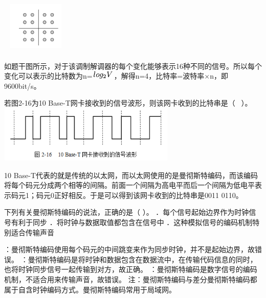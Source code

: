 ~
\includegraphics[width=1.04167in,height=1.04167in]{computerassets/B4EF6AF3A7F2C9C0FE3B7D8F48920A13.png}
\par{}
\begin{solution}如题干图所示，对于该调制解调器的每个变化能够表示16种不同的信号。所以每个变化可以表示的比特数为n=\includegraphics[width=0.43750in,height=0.14583in]{texmath/59cdc05Cdpi7B3507Dlog_2V}，解得n=4，比特率=波特率×n，即9600bit/s。
\end{solution}
\question 若图2-16为10 Base-T网卡接收到的信号波形，则该网卡收到的比特串是（ ~）。
\includegraphics[width=3.33333in,height=1.07292in]{computerassets/3FAE39CB101AFF3BB8DBABF6F9D0CF6B.png}
\par{}
\begin{solution}10
Base-T代表的就是传统的以太网，而以太网使用的是曼彻斯特编码，而该编码将每个码元分成两个相等的间隔。前面一个间隔为高电平而后一个间隔为低电平表示码元1；码元0正好相反。于是可以得到该网卡收到的比特串是0011
0110。
\end{solution}
\question 下列有关曼彻斯特编码的说法，正确的是（ ）。
．每个信号起始边界作为时钟信号有利于同步
．将时钟与数据取值都包含在信号中
．这种模拟信号的编码机制特别适合传输声音
\par{}
\begin{solution}：曼彻斯特编码使用每个码元的中间跳变来作为同步时钟，并不是起始边界，故错误。
：曼彻斯特编码是将时钟和数据包含在数据流中，在传输代码信息的同时，也将时钟同步信号一起传输到对方，故正确。
：曼彻斯特编码是数字信号的编码机制，不适合用来传输声音，故错误。
注：曼彻斯特编码与差分曼彻斯特编码都属于自含时钟编码方式。曼彻斯特编码常用于局域网。
\end{solution}
